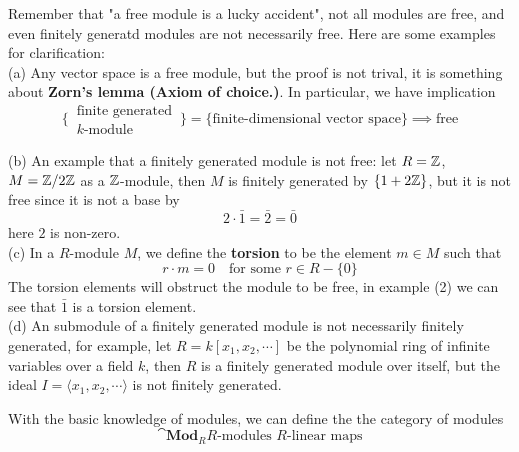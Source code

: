\documentclass[12pt,a4paper]{article}
\begin{document}
\begin{remark}
    Remember that "a free module is a lucky accident", not all modules are free, and even finitely generatd modules are not necessarily free. Here are some examples for clarification:\\

    (a) Any vector space is a free module, but the proof is not trival, it is something about \textbf{Zorn's lemma (Axiom of choice.)}. In particular, we have implication
    \[\{\, 
  \begin{array}{c}
    \text{finite generated} \\
    \text{$k$-module}
  \end{array}
\,\}
  = \{\text{finite-dimensional vector space}\} \implies \text{free}\]

    (b) An example that a finitely generated module is not free: let \(R = \mathbb{Z}\), \(M = \mathbb{Z}/2\mathbb{Z}\) as a \(\mathbb{Z}\)-module, then \(M\) is finitely generated by \(\{1+2\mathbb{Z}\}\), but it is not free since it is not a base by
    \[2 \cdot \bar{1} = \bar{2} = \bar{0}\]
    here \(2\) is non-zero.\\

    (c) In a \(R\)-module \(M\), we define the \textbf{torsion} to be the element \(m\in M\) such that 
    \[r \cdot m = 0 \quad \text{for some } r \in R-\{0\}\]
    The torsion elements will obstruct the module to be free, in example (2) we can see that \(\bar{1}\) is a torsion element.\\

    (d) An submodule of a finitely generated module is not necessarily finitely generated, for example, let \(R = k[x_1, x_2, \cdots]\) be the polynomial ring of infinite variables over a field \(k\), then \(R\) is a finitely generated module over itself, but the ideal \(I = \langle x_1, x_2, \cdots \rangle\) is not finitely generated.
\end{remark}

With the basic knowledge of modules, we can define the the category of modules
\[\cat{\mathbf{Mod}_R}{R\text{-modules } }{ R\text{-linear maps}}\]
\end{document}

